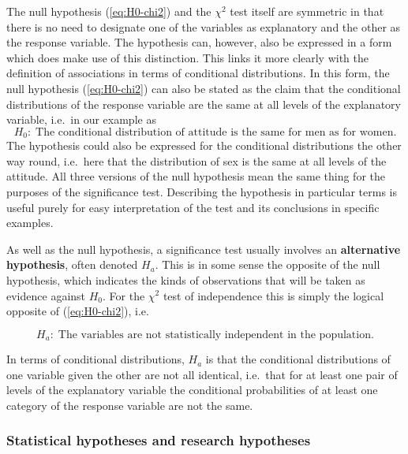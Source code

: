 \documentclass[11pt,a4paper,openany]{book}
\begin{document}
The null hypothesis (\ref{eq:H0-chi2}) and the \(\chi^{2}\) test itself
are symmetric in that there is no need to designate one of the variables
as explanatory and the other as the response variable. The hypothesis
can, however, also be expressed in a form which does make use of this
distinction. This links it more clearly with the definition of
associations in terms of conditional distributions. In this form, the
null hypothesis (\ref{eq:H0-chi2}) can also be stated as the claim that
the conditional distributions of the response variable are the same at
all levels of the explanatory variable, i.e.~in our example as
\[H_{0}: \;\text{The conditional distribution of attitude is the same for
men as for women}.\] The hypothesis could also be expressed for the
conditional distributions the other way round, i.e.~here that the
distribution of sex is the same at all levels of the attitude. All three
versions of the null hypothesis mean the same thing for the purposes of
the significance test. Describing the hypothesis in particular terms is
useful purely for easy interpretation of the test and its conclusions in
specific examples.

As well as the null hypothesis, a significance test usually involves an
\textbf{alternative hypothesis}, often denoted \(H_{a}\). This is in
some sense the opposite of the null hypothesis, which indicates the
kinds of observations that will be taken as evidence against \(H_{0}\).
For the \(\chi^{2}\) test of independence this is simply the logical
opposite of (\ref{eq:H0-chi2}), i.e.

\begin{equation}H_{a}: \;\text{The variables are not statistically independent in the
population}.
\label{eq:Ha-chi2}\end{equation}

In terms of conditional distributions, \(H_{a}\) is that the conditional
distributions of one variable given the other are not all identical,
i.e.~that for at least one pair of levels of the explanatory variable
the conditional probabilities of at least one category of the response
variable are not the same.

\subsubsection*{Statistical hypotheses and research
hypotheses}\label{statistical-hypotheses-and-research-hypotheses}
\end{document}
